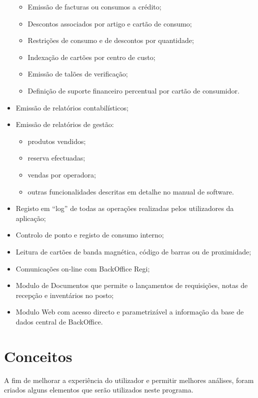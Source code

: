 \documentclass[a4paper,11pt,openany]{memoir}
\begin{document}
\begin{itemize}
\begin{itemize}
\item Emissão de facturas ou consumos a crédito;
\item Descontos associados por artigo e cartão de consumo;
\item Restrições de consumo e de descontos por quantidade;
\item Indexação de cartões por centro de custo;
\item Emissão de talões de verificação;
\item Definição de suporte financeiro percentual por cartão de consumidor.
\end{itemize}
\item Emissão de relatórios contabilísticos;
\item Emissão de relatórios de gestão:
\begin{itemize}
\item produtos vendidos;
\item reserva efectuadas;
\item vendas por operadora;
\item outras funcionalidades descritas em detalhe no manual de software.
\end{itemize}
\item Registo em “log” de todas as operações realizadas pelos utilizadores da aplicação;
\item Controlo de ponto e registo de consumo interno;
\item Leitura de cartões de banda magnética, código de barras ou de proximidade;
\item Comunicações on-line com BackOffice Regi;
\item Modulo de Documentos que permite o lançamentos de requisições, notas de recepção e inventários no posto;
\item Modulo Web com acesso directo e parametrizável a informação da base de dados central de BackOffice.

\end{itemize}





\newpage
\section{Conceitos}

A fim de melhorar a experiência do utilizador e permitir melhores análises, foram criados alguns elementos 
que serão utilizados neste programa.
\end{document}
